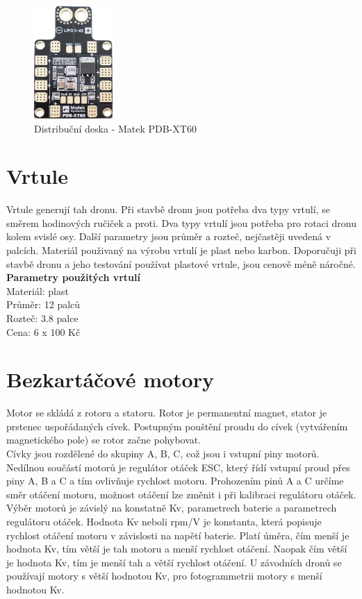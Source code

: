 \begin{figure}[H]
	\centering
	\includegraphics[width=3cm]{pictures/pdb.jpg}
	\caption{Distribuční deska - Matek PDB-XT60}
\end{figure}

\section{Vrtule} 
Vrtule generují tah dronu. Při stavbě dronu jsou potřeba dva typy vrtulí, se směrem hodinových ručiček a proti. Dva typy vrtulí jsou potřeba pro rotaci dronu kolem svislé osy. Další parametry jsou průměr a rozteč, nejčastěji uvedená v palcích. Materiál použivaný na výrobu vrtulí je plast nebo karbon. Doporučuji při stavbě dronu a jeho testování používat plastové vrtule, jsou cenově méně náročné.\\

\textbf{Parametry použitých vrtulí}\\
Materiál: plast\\
Průměr: 12 palců\\
Rozteč: 3.8 palce\\
Cena: 6 x 100 Kč\\

\section{Bezkartáčové motory} 
Motor se skládá z rotoru a statoru. Rotor je permanentní magnet, stator je prstenec uspořádaných cívek. Postupným pouštění proudu do cívek (vytvářením magnetic\-kého pole) se rotor začne pohybovat.\\
Cívky jsou rozdělené do skupiny A, B, C, což jsou i vstupní piny motorů.  Nedílnou součástí motorů je regulátor otáček ESC, který řídí vstupní proud přes piny A, B a C a tím ovlivňuje rychlost motoru. Prohozením pinů A a C určíme směr otáčení motoru, možnost otáčení lze změnit i při kalibraci regulátoru otáček.\cite{learnengineering}\\
Výběr motorů je závislý na konstatně Kv, parametrech baterie a parametrech re\-gulátoru otáček. Hodnota Kv neboli rpm/V je konstanta, která popisuje rychlost otáčení motoru v závislosti na napětí baterie. Platí úměra, čím menší je hodnota Kv, tím větší je tah motoru  a menší rychlost otáčení. Naopak čím  větší je hodnota Kv, tím je menší tah a větší rychlost otáčení. U závodních dronů se používají motory s větší hodnotou Kv, pro fotogrammetrii motory s menší hodnotou Kv.\cite{kv} \cite{siieefpv}\\

